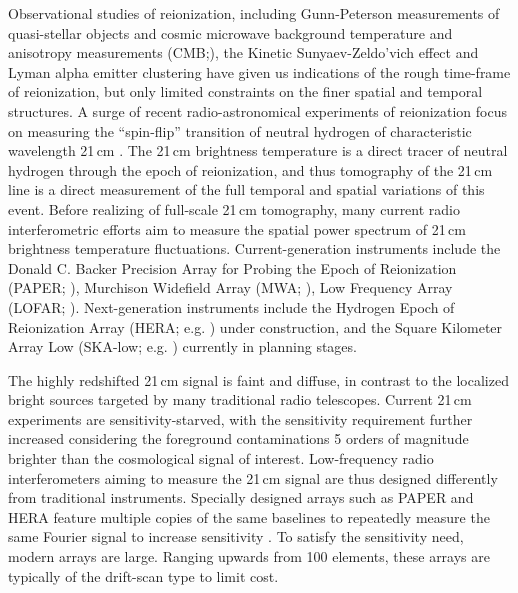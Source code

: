 \documentclass[twocolumn,apj,numberedappendix]{emulateapj}
\renewcommand\[{\begin{equation}}
\renewcommand\]{\end{equation}}
\begin{document}
Observational studies of reionization, including Gunn-Peterson measurements of quasi-stellar objects \citep{Fan2006} and cosmic microwave background temperature and anisotropy measurements (CMB;\citealt{Planck2016}), the Kinetic Sunyaev-Zeldo'vich effect \citep{kszpatchy} and Lyman alpha emitter clustering \citep{mcquinnLyA} have given us indications of the rough time-frame of reionization, but only limited constraints on the finer spatial and temporal structures. A surge of recent radio-astronomical experiments of reionization focus on measuring the ``spin-flip'' transition of neutral
hydrogen of characteristic wavelength 21\,cm \citep{Furlanetto2006181,PritchardLoeb}.
The 21\,cm brightness temperature is a direct tracer of neutral hydrogen through the epoch of reionization, and thus tomography of the 21\,cm line is a direct measurement of the full temporal and spatial variations of this event. 
Before realizing of full-scale 21\,cm tomography, many current radio interferometric efforts
aim to measure the spatial power spectrum of 21\,cm brightness temperature fluctuations.
Current-generation instruments include the Donald C. Backer Precision Array for Probing
the Epoch of Reionization (PAPER; \citealt{Ali2015,paper32}), Murchison
Widefield Array (MWA; \citealt{Bowman2013, Tingay2013}), Low Frequency Array (LOFAR; \citealt{LOFAR}). Next-generation instruments include the Hydrogen Epoch of Reionization
Array (HERA; e.g. \citealt{HERA,HERAconfiguration,HERABEAM1,HERADISH2})  under construction, 
and the Square Kilometer Array Low (SKA-low; e.g. \citealt{SKA1}) currently in planning stages. 

The highly redshifted 21\,cm signal is faint and diffuse, in contrast to the localized bright sources targeted by many traditional radio telescopes.  Current 21\,cm experiments are sensitivity-starved, with the sensitivity requirement further increased considering the foreground contaminations 5 orders of magnitude brighter than the cosmological signal of interest. Low-frequency radio interferometers aiming to measure the 21\,cm signal are thus designed differently from traditional instruments. Specially designed arrays such as PAPER and HERA feature multiple copies of the same baselines to repeatedly measure the same Fourier signal to increase sensitivity \citep{first-paper}. To satisfy the sensitivity need, modern arrays are large. Ranging upwards from 100 elements, these arrays are typically of the drift-scan type to limit cost.
\end{document}
